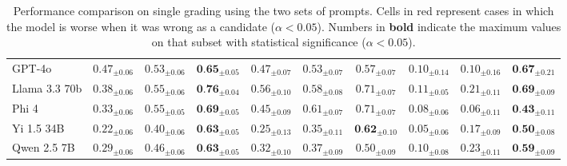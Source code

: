 \begin{table}[ht!]
{\begin{tabular}{l|ccc|ccc|ccc}
\hline
GPT-4o & $0.47_{\pm 0.06 }$ & $0.53_{\pm 0.06 }$ & $\textbf{0.65}_{\pm 0.05 }$ & $0.47_{\pm 0.07 }$ & $0.53_{\pm 0.07 }$ & $0.57_{\pm 0.07 }$ & \R $0.10_{\pm 0.14 }$ & \R $0.10_{\pm 0.16 }$ & $\textbf{0.67}_{\pm 0.21 }$ \\
Llama 3.3 70b & $0.38_{\pm 0.06 }$ & $0.55_{\pm 0.06 }$ & $\textbf{0.76}_{\pm 0.04 }$ & $0.56_{\pm 0.10 }$ & $0.58_{\pm 0.08 }$ & $0.71_{\pm 0.07 }$ & \R $0.11_{\pm 0.05 }$ & \R $0.21_{\pm 0.11 }$ & $\textbf{0.69}_{\pm 0.09 }$ \\
Phi 4 & $0.33_{\pm 0.06 }$ & $0.55_{\pm 0.05 }$ & $\textbf{0.69}_{\pm 0.05 }$ & $0.45_{\pm 0.09 }$ & $0.61_{\pm 0.07 }$ & $0.71_{\pm 0.07 }$ & \R $0.08_{\pm 0.06 }$ & \R $0.06_{\pm 0.11 }$ & \R $\textbf{0.43}_{\pm 0.11 }$ \\
Yi 1.5 34B & $0.22_{\pm 0.06 }$ & $0.40_{\pm 0.06 }$ & $\textbf{0.63}_{\pm 0.05 }$ & $0.25_{\pm 0.13 }$ & $0.35_{\pm 0.11 }$ & $\textbf{0.62}_{\pm 0.10 }$ & \R $0.05_{\pm 0.06 }$ & $0.17_{\pm 0.09 }$ & $\textbf{0.50}_{\pm 0.08 }$ \\
Qwen 2.5 7B & $0.29_{\pm 0.06 }$ & $0.46_{\pm 0.06 }$ & $\textbf{0.63}_{\pm 0.05 }$ & $0.32_{\pm 0.10 }$ & $0.37_{\pm 0.09 }$ & $0.50_{\pm 0.09 }$ & \R $0.10_{\pm 0.08 }$ & $0.23_{\pm 0.11 }$ & $\textbf{0.59}_{\pm 0.09 }$ \\

\bottomrule
\end{tabular}
}
\caption{Performance comparison on single grading using the two sets of prompts. Cells in \colorbox{red!30}{red} represent cases in which the model is worse when it was wrong as a candidate ($\alpha < 0.05$). Numbers in \textbf{bold} indicate the maximum values on that subset with statistical significance ($\alpha < 0.05$).}
\label{tab:right-wrong-table-kappa-v1}
\end{table}
